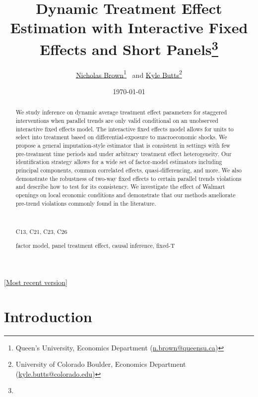 \documentclass[12pt]{article}
\title{%
  Dynamic Treatment Effect Estimation with Interactive Fixed Effects and Short Panels\thanks{\acknowledgements}
}
\author{%
  \href{https://sites.google.com/msu.edu/nicholasbrown}{Nicholas Brown}\thanks{Queen's University, Economics Department (\href{mailto:n.brown@queensu.ca}{n.brown@queensu.ca})}
  \ and 
  \href{https://kylebutts.com/}{Kyle Butts}\thanks{University of Colorado Boulder, Economics Department (\href{mailto:kyle.butts@colorado.edu}{kyle.butts@colorado.edu})}
}
\date{\textsc{\today}}
\begin{document}
\maketitle
\vspace{-4mm}
\noindent\href{https://kylebutts.com/files/JMP.pdf}{[Most recent version]}

\begin{abstract}
  We study inference on dynamic average treatment effect parameters for staggered interventions when parallel trends are only valid conditional on an unobserved interactive fixed effects model. The interactive fixed effects model allows for units to select into treatment based on differential-exposure to macroeconomic shocks. We propose a general imputation-style estimator that is consistent in settings with few pre-treatment time periods and under arbitrary treatment effect heterogeneity. Our identification strategy allows for a wide set of factor-model estimators including principal components, common correlated effects, quasi-differencing, and more. %
  We also demonstrate the robustness of two-way fixed effects to certain parallel trends violations and describe how to test for its consistency. We investigate the effect of Walmart openings on local economic conditions and demonstrate that our methods ameliorate pre-trend violations commonly found in the literature.
  
  \par~\par\noindent
   C13, C21, C23, C26
  \par
   factor model, panel treatment effect, causal inference, fixed-T
  \par\vspace{-2.5mm}
\end{abstract}

\newpage


\section{Introduction}
\end{document}
